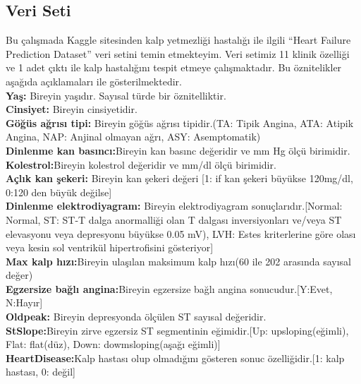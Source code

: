 \documentclass[conference]{IEEEtran}
\begin{document}
\subsection{Veri Seti}
Bu çalışmada Kaggle sitesinden kalp yetmezliği hastalığı ile ilgili “Heart Failure Prediction Dataset” veri setini temin etmekteyim\cite{veriseti}. Veri setimiz 11 klinik özelliği ve 1 adet çıktı ile kalp hastalığını tespit etmeye çalışmaktadır. Bu öznitelikler aşağıda açıklamaları ile gösterilmektedir.\\
\textbf{Yaş:} Bireyin yaşıdır. Sayısal türde bir öznitelliktir.\\
\textbf{Cinsiyet:} Bireyin cinsiyetidir.\\
\textbf{Göğüs ağrısı tipi:} Bireyin göğüs ağrısı tipidir.(TA: Tipik Angina, ATA: Atipik Angina, NAP: Anjinal olmayan ağrı, ASY: Asemptomatik)\\
\textbf{Dinlenme kan basıncı:}Bireyin kan basınc değeridir ve mm Hg ölçü birimidir.\\
\textbf{Kolestrol:}Bireyin kolestrol değeridir ve mm/dl ölçü birimidir.\\
\textbf{Açlık kan şekeri:} Bireyin kan şekeri değeri [1: if kan şekeri büyükse 120mg/dl, 0:120 den büyük değilse]\\
\textbf{Dinlenme elektrodiyagram:} Bireyin elektrodiyagram sonuçlarıdır.[Normal: Normal, ST: ST-T dalga anormalliği olan T dalgası inversiyonları ve/veya ST elevasyonu veya depresyonu büyükse 0.05 mV), LVH: Estes kriterlerine göre olası veya kesin sol ventrikül hipertrofisini gösteriyor]\\
\textbf{Max kalp hızı:}Bireyin ulaşılan maksimum kalp hızı(60 ile 202 arasında sayısal değer)\\
\textbf{Egzersize bağlı angina:}Bireyin egzersize bağlı angina sonucudur.[Y:Evet, N:Hayır]\\
\textbf{Oldpeak:} Bireyin depresyonda ölçülen ST sayısal değeridir.\\
\textbf{StSlope:}Bireyin zirve egzersiz ST segmentinin eğimidir.[Up: upsloping(eğimli), Flat: flat(düz), Down: dowmsloping(aşağı eğimli)]\\
\textbf{HeartDisease:}Kalp hastası olup olmadığını gösteren sonuc özelliğidir.[1: kalp hastası, 0: değil]
\end{document}
